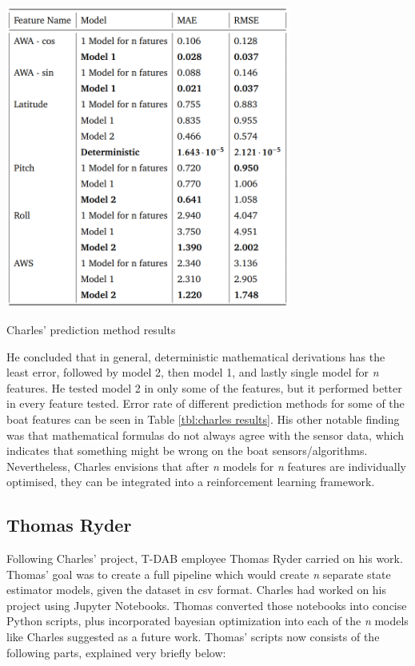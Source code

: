 \documentclass[12pt,twoside]{report}
\begin{document}
\begin{table}[h]
\centering
\includegraphics[width=0.7\textwidth]{figures/charles results.png}
\caption{Charles' prediction method results \cite{charles}}
\label{tbl:charles results}
\end{table}

He concluded that in general, deterministic mathematical derivations has the least error, followed by model 2, then model 1, and lastly single model for \emph{n} features. He tested model 2 in only some of the features, but it performed better in every feature tested. Error rate of different prediction methods for some of the boat features can be seen in Table \ref{tbl:charles results}. His other notable finding was that mathematical formulas do not always agree with the sensor data, which indicates that something might be wrong on the boat sensors/algorithms. Nevertheless, Charles envisions that after \emph{n} models for \emph{n} features are individually optimised, they can be integrated into a reinforcement learning framework.

\subsection{Thomas Ryder}

Following Charles' project, T-DAB employee Thomas Ryder carried on his work. Thomas' goal was to create a full pipeline which would create \emph{n} separate state estimator models, given the dataset in csv format. Charles had worked on his project using Jupyter Notebooks. Thomas converted those notebooks into concise Python scripts, plus incorporated bayesian optimization into each of the \emph{n} models like Charles suggested as a future work. Thomas' scripts now consists of the following parts, explained very briefly below:
\end{document}
